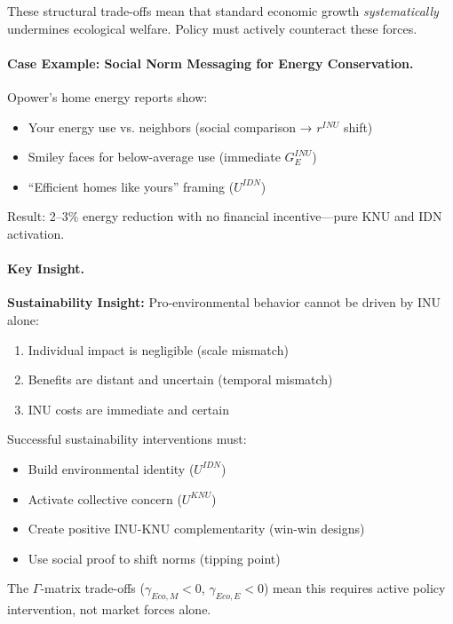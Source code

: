 These structural trade-offs mean that standard economic growth 
\emph{systematically} undermines ecological welfare. Policy must 
actively counteract these forces.

\paragraph{Case Example: Social Norm Messaging for Energy Conservation.}
Opower's home energy reports show:
\begin{itemize}
\item Your energy use vs. neighbors (social comparison → $r^{INU}$ shift)
\item Smiley faces for below-average use (immediate $G^{INU}_E$)
\item ``Efficient homes like yours'' framing ($U^{IDN}$)
\end{itemize}

Result: 2--3\% energy reduction with no financial incentive---pure
KNU and IDN activation.

\paragraph{Key Insight.}
\begin{tcolorbox}[colback=yellow!10!white, colframe=yellow!50!black]
\textbf{Sustainability Insight:}
Pro-environmental behavior cannot be driven by INU alone:
\begin{enumerate}
\item Individual impact is negligible (scale mismatch)
\item Benefits are distant and uncertain (temporal mismatch)
\item INU costs are immediate and certain
\end{enumerate}
Successful sustainability interventions must:
\begin{itemize}
\item Build environmental identity ($U^{IDN}$)
\item Activate collective concern ($U^{KNU}$)
\item Create positive INU-KNU complementarity (win-win designs)
\item Use social proof to shift norms (tipping point)
\end{itemize}
The $\Gamma$-matrix trade-offs ($\gamma_{Eco,M} < 0$, $\gamma_{Eco,E} < 0$) 
mean this requires active policy intervention, not market forces alone.
\end{tcolorbox}

